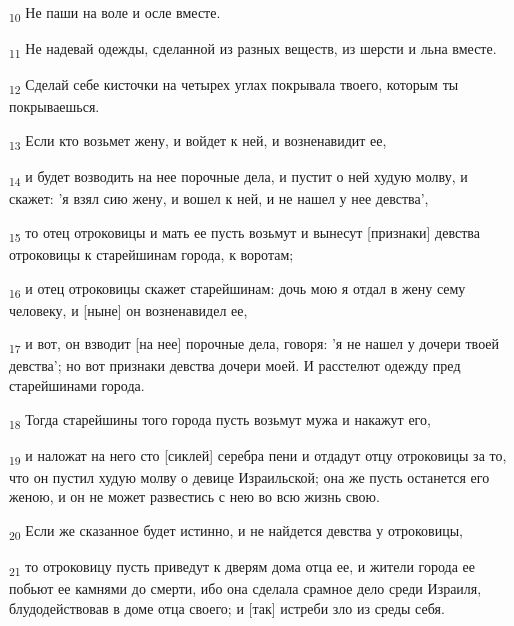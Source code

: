 \begin{tcolorbox}
\textsubscript{10} Не паши на воле и осле вместе.
\end{tcolorbox}
\begin{tcolorbox}
\textsubscript{11} Не надевай одежды, сделанной из разных веществ, из шерсти и льна вместе.
\end{tcolorbox}
\begin{tcolorbox}
\textsubscript{12} Сделай себе кисточки на четырех углах покрывала твоего, которым ты покрываешься.
\end{tcolorbox}
\begin{tcolorbox}
\textsubscript{13} Если кто возьмет жену, и войдет к ней, и возненавидит ее,
\end{tcolorbox}
\begin{tcolorbox}
\textsubscript{14} и будет возводить на нее порочные дела, и пустит о ней худую молву, и скажет: 'я взял сию жену, и вошел к ней, и не нашел у нее девства',
\end{tcolorbox}
\begin{tcolorbox}
\textsubscript{15} то отец отроковицы и мать ее пусть возьмут и вынесут [признаки] девства отроковицы к старейшинам города, к воротам;
\end{tcolorbox}
\begin{tcolorbox}
\textsubscript{16} и отец отроковицы скажет старейшинам: дочь мою я отдал в жену сему человеку, и [ныне] он возненавидел ее,
\end{tcolorbox}
\begin{tcolorbox}
\textsubscript{17} и вот, он взводит [на нее] порочные дела, говоря: 'я не нашел у дочери твоей девства'; но вот признаки девства дочери моей. И расстелют одежду пред старейшинами города.
\end{tcolorbox}
\begin{tcolorbox}
\textsubscript{18} Тогда старейшины того города пусть возьмут мужа и накажут его,
\end{tcolorbox}
\begin{tcolorbox}
\textsubscript{19} и наложат на него сто [сиклей] серебра пени и отдадут отцу отроковицы за то, что он пустил худую молву о девице Израильской; она же пусть останется его женою, и он не может развестись с нею во всю жизнь свою.
\end{tcolorbox}
\begin{tcolorbox}
\textsubscript{20} Если же сказанное будет истинно, и не найдется девства у отроковицы,
\end{tcolorbox}
\begin{tcolorbox}
\textsubscript{21} то отроковицу пусть приведут к дверям дома отца ее, и жители города ее побьют ее камнями до смерти, ибо она сделала срамное дело среди Израиля, блудодействовав в доме отца своего; и [так] истреби зло из среды себя.
\end{tcolorbox}
